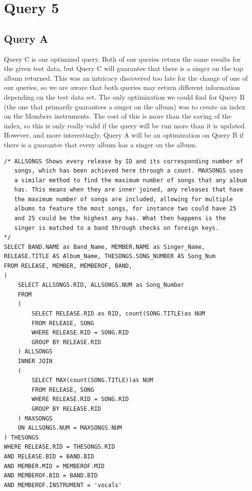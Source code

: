\documentclass{report}
\begin{document}
\section*{Query 5}
\subsection*{Query A}
Query C is our optimized query. Both of our queries return the same
results for the given test data, but Query C will guarantee that there
is a singer on the top album returned. This was an intricacy
discovered too late for the change of one of our queries, so we are
aware that both queries may return different information depending on
the test data set.
The only optimization we could find for Query B (the one that
primarily guarantees a singer on the album) was to create an index on
the Members instruments. The cost of this is more than the saving of
the index, so this is only really valid if the query will be run more
than it is updated. However, and more interestingly, Query A will be
an optimization on Query B if there is a guarantee that every album
has a singer on the album.
\begin{verbatim}
/* ALLSONGS Shows every release by ID and its corresponding number of
   songs, which has been achieved here through a count. MAXSONGS uses
   a similar method to find the maximum number of songs that any album
   has. This means when they are inner joined, any releases that have
   the maximum number of songs are included, allowing for multiple
   albums to feature the most songs, for instance two could have 25
   and 25 could be the highest any has. What then happens is the
   singer is matched to a band through checks on foreign keys.
*/
SELECT BAND.NAME as Band_Name, MEMBER.NAME as Singer_Name,
RELEASE.TITLE AS Album_Name, THESONGS.SONG_NUMBER AS Song_Num
FROM RELEASE, MEMBER, MEMBEROF, BAND, 
(
    SELECT ALLSONGS.RID, ALLSONGS.NUM as Song_Number
    FROM 
    (
        SELECT RELEASE.RID as RID, count(SONG.TITLE)as NUM
        FROM RELEASE, SONG
        WHERE RELEASE.RID = SONG.RID
        GROUP BY RELEASE.RID
    ) ALLSONGS
    INNER JOIN
    (
        SELECT MAX(count(SONG.TITLE))as NUM
        FROM RELEASE, SONG
        WHERE RELEASE.RID = SONG.RID
        GROUP BY RELEASE.RID
    ) MAXSONGS 
    ON ALLSONGS.NUM = MAXSONGS.NUM
) THESONGS
WHERE RELEASE.RID = THESONGS.RID
AND RELEASE.BID = BAND.BID 
AND MEMBER.MID = MEMBEROF.MID
AND MEMBEROF.BID = BAND.BID
AND MEMBEROF.INSTRUMENT = 'vocals'
\end{verbatim}
\end{document}
